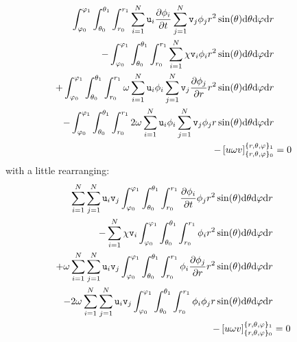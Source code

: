 \begin{equation}
\begin{split}
  \intr \sum_{i=1}^N\ui_i\doverd{\phi_i}{t}\sum_{j=1}^N\vi_j \phi_j \dVs \\
- \intr \sum_{i=1}^N\chi\vi_i\phi_i \dVs \\
+ \intr \omega\sum_{i=1}^N\ui_i\phi_i\sum_{j=1}^N\vi_j\doverd{\phi_j}{r} \dVs \\
- \intr 2\omega\sum_{i=1}^N\ui_i\phi_i\sum_{j=1}^N\vi_j\phi_jr\sin(\theta)\dd\theta\dd\varphi\dd r \\
- \left[u\omega v\right]^{\{r,\theta,\varphi\}_1}_{\{r,\theta,\varphi\}_0} & = 0
\end{split}
\end{equation}
with a little rearranging:
\begin{equation}
\begin{split}
  \sum_{i=1}^N\sum_{j=1}^N\ui_i\vi_j\intr\doverd{\phi_i}{t}\phi_j \dVs \\
- \sum_{i=1}^N\chi\vi_i\intr\phi_i \dVs \\
+ \omega\sum_{i=1}^N\sum_{j=1}^N\ui_i\vi_j\intr\phi_i\doverd{\phi_j}{r} \dVs \\
- 2\omega\sum_{i=1}^N\sum_{j=1}^N\ui_i\vi_j\intr\phi_i\phi_jr\sin(\theta)\dd\theta\dd\varphi\dd r \\
- \left[u\omega v\right]^{\{r,\theta,\varphi\}_1}_{\{r,\theta,\varphi\}_0} & = 0
\end{split}
\end{equation}
